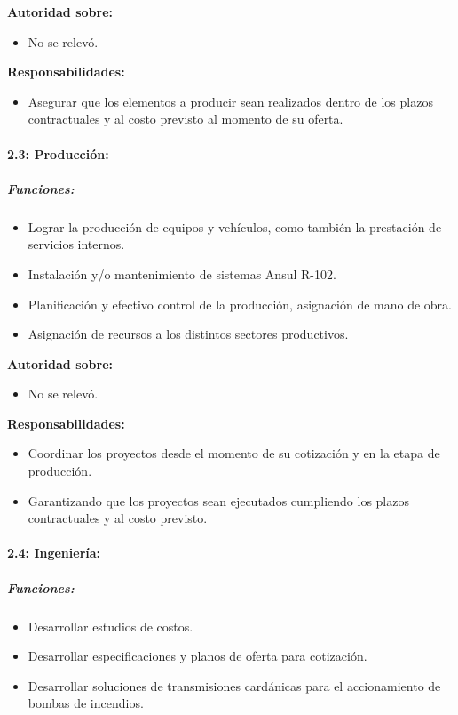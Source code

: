 \documentclass[a4paper,10pt]{article}
\begin{document}
		\textbf{Autoridad sobre:} 
		\begin{itemize}
		\item No se relevó.
		\end{itemize}

		\textbf{Responsabilidades:}
		\begin{itemize}
			\item Asegurar que los elementos a producir sean realizados dentro de los plazos contractuales y al costo previsto al momento de su oferta.
		\end{itemize}

		\paragraph{2.3: Producción:}

			\subparagraph{Funciones:}
			\begin{itemize}
 			\item Lograr la producción de equipos y vehículos, como también la prestación de servicios internos.
 			\item Instalación y/o mantenimiento de sistemas Ansul R-102.
 			\item Planificación y efectivo control de la producción, asignación de mano de obra.
	 		\item Asignación de recursos a los distintos sectores productivos.
	 		\end{itemize}
			

		\textbf{Autoridad sobre:} 
		\begin{itemize}
		\item No se relevó.
		\end{itemize}

			\textbf{Responsabilidades:}
			\begin{itemize}
				\item Coordinar los proyectos desde el momento de su cotización y en la etapa de producción.
				\item Garantizando que los proyectos sean ejecutados cumpliendo los plazos contractuales y al costo
previsto.
			\end{itemize}

			\paragraph{2.4: Ingeniería:}
			\subparagraph{Funciones:}
			\begin{itemize}
	 			\item Desarrollar estudios de costos.
	 			\item Desarrollar especificaciones y planos de oferta para cotización. 
	 			\item Desarrollar soluciones de transmisiones cardánicas para el accionamiento de bombas de incendios.
	 		\end{itemize}
			
\end{document}
